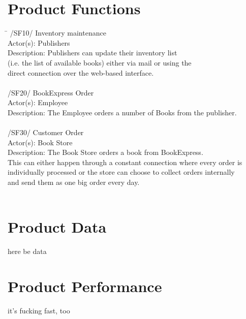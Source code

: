 \documentclass[a4paper]{article}
\begin{document}
\section{Product Functions}
\begin{tabbing}
\hspace{3cm}\=\kill
  /SF10/ \> Inventory maintenance \\ 
  Actor(s): \> Publishers\\ 
  Description: \> Publishers can update their inventory list\\ \> (i.e. the list of available books) either via   	mail or using the \\ \> direct connection over the web-based interface.\\
  \\
  /SF20/ \> BookExpress Order \\
  Actor(s): \> Employee \\
  Description: \> The Employee orders a number of Books from the publisher.\\
  \\
 /SF30/ \> Customer Order \\
 Actor(s): \> Book Store \\
 Description: \> The Book Store orders a book from BookExpress. \\
 \> This can either happen through a constant connection where every order is \\
 \> individually processed or the store can choose to collect orders internally \\
 \> and send them as one big order every day. \\
 \\
 
\end{tabbing} 
\section{Product Data}
here be data
\\
\section{Product Performance}
it's fucking fast, too
\end{document}
